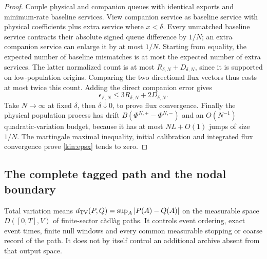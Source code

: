 \documentclass[11pt]{article}
\theoremstyle{definition}\newtheorem{definition}[theorem]{Definition}
\theoremstyle{remark}\newtheorem{remark}[theorem]{Remark}
\begin{document}
\begin{proof}
Couple physical and companion queues with identical exports and
minimum-rate baseline services. View companion service as baseline
service with physical coefficients plus extra service where $x<\delta$.
Every unmatched baseline service contracts their absolute signed queue
difference by $1/N$; an extra companion service can enlarge it by at most
$1/N$. Starting from equality, the expected number of baseline mismatches
is at most the expected number of extra services. The latter normalized
count is at most $R_{\delta,N}+D_{\delta,N}$, since it is supported on
low-population origins. Comparing the two directional flux vectors thus
costs at most twice this count. Adding the direct companion error gives
\begin{equation}
 \epsilon_{F,N}\le3R_{\delta,N}+2D_{\delta,N}.
 \label{kin:fluxbridge}
\end{equation}
Take $N\to\infty$ at fixed $\delta$, then $\delta\downarrow0$, to prove
flux convergence. Finally the physical population process has drift
$B(\Phi^{N,+}-\Phi^{N,-})$ and an $O(N^{-1})$ quadratic-variation budget,
because it has at most $NL+O(1)$ jumps of size $1/N$. The martingale
maximal inequality, initial calibration and integrated flux convergence
prove \eqref{kin:epsx} tends to zero.
\end{proof}

\subsection{The complete tagged path and the nodal boundary}
Total variation means $d_{\mathrm{TV}}(P,Q)=\sup_A|P(A)-Q(A)|$ on the measurable
space $D([0,T],V)$ of finite-sector c\`adl\`ag paths. It controls event
ordering, exact event times, finite null windows and every common measurable
stopping or coarse record of the path. It does not by itself control an
additional archive absent from that output space.
\end{document}
